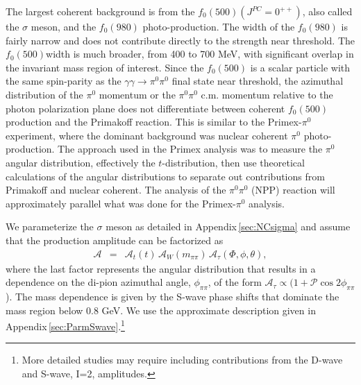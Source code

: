  The largest coherent background is  
from the $f_0(500)(J^{PC}=0^{++})$, also called the $\sigma$ meson, and the $f_0(980)$ photo-production.  The width of the
$f_0(980)$ is fairly narrow and does not contribute directly to the strength near threshold.
The $f_0(500)$width is much
broader, from 400 to 700 MeV, with significant overlap in the
invariant mass region of interest.  Since the $f_0(500)$ is a scalar
particle with the same spin-parity as the $\gamma \gamma \rightarrow
\pi^0\pi^0$ final state near threshold, the azimuthal distribution of
the $\pi^0$ momentum or the $\pi^0\pi^0$ c.m. momentum relative to the
photon polarization plane does not differentiate between coherent
$f_0(500)$ production and the Primakoff reaction.  
This is similar to the Primex-$\pi^0$ experiment, where the dominant background was
nuclear coherent $\pi^0$ photo-production.  The approach used in the
Primex analysis was to measure the $\pi^0$ angular distribution,
effectively the $t$-distribution, then use theoretical calculations of
the angular distributions to separate out contributions from Primakoff
and nuclear coherent. The analysis of the $\pi^0\pi^0$ (NPP) reaction
will approximately parallel what was done for the Primex-$\pi^0$
analysis.  

We parameterize the $\sigma$ meson as detailed in Appendix\,\ref{sec:NCsigma} and assume that the production amplitude can be factorized as
\begin{eqnarray}
\mathcal{A} & = & \mathcal{A}_t(t) \, \mathcal{A}_W(m_{\pi\pi}) \, \mathcal{A}_\tau(\Phi, \phi, \theta),
\end{eqnarray}
where the last factor represents the angular distribution that results in a 
dependence on the di-pion azimuthal angle, $\phi_{\pi\pi}$, of the form $\mathcal{A}_\tau \propto (1 + \mathcal{P} \cos{2\phi_{\pi\pi}}$). 
The mass dependence is given by the S-wave phase shifts that dominate the mass region below 0.8 GeV. We use the approximate description given in 
Appendix\,\ref{sec:ParmSwave}.\footnote{More detailed studies may require including contributions from the D-wave and S-wave, I=2, amplitudes.} 

